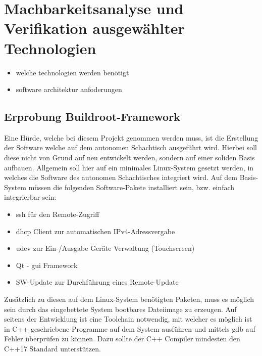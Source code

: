 \hypertarget{machbarkeitsanalyse-und-verifikation-ausgewuxe4hlter-technologien}{%
\chapter{Machbarkeitsanalyse und Verifikation ausgewählter
Technologien}\label{machbarkeitsanalyse-und-verifikation-ausgewuxe4hlter-technologien}}

\begin{itemize}
\tightlist
\item
  welche technologien werden benötigt
\item
  software architektur anfoderungen
\end{itemize}

\hypertarget{erprobung-buildroot-framework}{%
\section{Erprobung
Buildroot-Framework}\label{erprobung-buildroot-framework}}

Eine Hürde, welche bei diesem Projekt genommen werden muss, ist die
Erstellung der Software welche auf dem autonomen Schachtisch ausgeführt
wird. Hierbei soll diese nicht von Grund auf neu entwickelt werden,
sondern auf einer soliden Basis aufbauen. Allgemein soll hier auf ein
minimales Linux-System gesetzt werden, in welches die Software des
autonomen Schachtisches integriert wird. Auf dem Basis-System müssen die
folgenden Software-Pakete installiert sein, bzw. einfach integrierbar
sein:

\begin{itemize}
\tightlist
\item
  \gls{ssh} für den Remote-Zugriff
\item
  \gls{dhcp} Client zur automatischen IPv4-Adressvergabe
\item
  \gls{udev} zur Ein-/Ausgabe Geräte Verwaltung (Touchscreen)
\item
  Qt\cite{qtframework} - \gls{gui} Framework
\item
  SW-Update zur Durchführung eines Remote-Update
\end{itemize}

Zusätzlich zu diesen auf dem Linux-System benötigten Paketen, muss es
möglich sein durch das eingebettete System bootbares Dateiimage zu
erzeugen. Auf seitens der Entwicklung ist eine Toolchain notwendig, mit
welcher es möglich ist in C++ geschriebene Programme auf dem System
ausführen und mittels \gls{gdb} auf Fehler überprüfen zu können. Dazu
sollte der C++ Compiler mindesten den C++17 Standard unterstützen.

